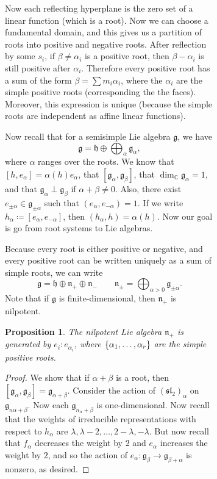 \documentclass[leqno, openany]{memoir}
\newtheorem{prop}[thm]{Proposition}
\theoremstyle{definition}
\theoremstyle{remark}
\theoremstyle{plain}
\theoremstyle{definition}
\theoremstyle{remark}
\newcommand{\C}{\mathbb{C}}
\newcommand{\mf}[1]{\mathfrak{#1}}
\begin{document}
\begin{figure}[H]
\begin{figure}[H]
Now each reflecting hyperplane is the zero set of a linear function (which is a
root). Now we can choose a fundamental domain, and this gives us a partition of
roots into positive and negative roots. After reflection by some $s_i$, if
$\beta \neq \alpha_i$ is a positive root, then $\beta - \alpha_i$ is still
positive after $\alpha_i$. Therefore every positive root has a sum of the form
$\beta = \sum m_i \alpha_i$, where the $\alpha_i$ are the simple positive roots
(corresponding the the faces). Moreover, this expression is unique (because the
simple roots are independent as affine linear functions).

Now recall that for a semisimple Lie algebra $\mf{g}$, we have \[ \mf{g} =
\mf{h} \oplus \bigoplus_{\alpha} \mf{g}_{\alpha}, \] where $\alpha$ ranges over
the roots. We know that $[h,e_{\alpha}] = \alpha(h) e_{\alpha}$, that
$[\mf{g}_{\alpha}, \mf{g}_{\beta}]$, that $\dim_{\C} \mf{g}_{\alpha} = 1$, and
that $\mf{g}_{\alpha} \perp \mf{g}_{\beta}$ if $\alpha + \beta \neq 0$. Also,
there exist $e_{\pm \alpha} \in \mf{g}_{\pm \alpha}$ such that $(e_{\alpha},
e_{-\alpha}) = 1$. If we write $h_{\alpha} \coloneqq [e_{\alpha},
e_{-\alpha}]$, then $(h_{\alpha}, h) = \alpha(h)$. Now our goal is go from root
systems to Lie algebras.

Because every root is either positive or negative, and every positive root can
be written uniquely as a sum of simple roots, we can write \[ \mf{g} = \mf{h}
\oplus \mf{n}_+ \oplus \mf{n}_- \qquad \mf{n}_{\pm} = \bigoplus_{\alpha > 0}
\mf{g}_{\pm \alpha}. \] Note that if $\mf{g}$ is finite-dimensional, then
$\mf{n}_+$ is nilpotent.

\begin{prop} The nilpotent Lie algebra $\mf{n}_+$ is generated by $e_i \colon
e_{\alpha_i}$, where $\qty{\alpha_1, \ldots, \alpha_r}$ are the simple positive
roots.  \end{prop}

\begin{proof} We show that if $\alpha + \beta$ is a root, then
    $[\mf{g}_{\alpha}, \mf{g}_{\beta}] = \mf{g}_{\alpha + \beta}$. Consider the
    action of ${(\mf{sl}_2)}_{\alpha}$ on $\mf{g}_{n \alpha + \beta}$. Now each
    $\mf{g}_{n_{\alpha} + \beta}$ is one-dimensional. Now recall that the
    weights of irreducible representations with respect to $h_{\alpha}$ are
    $\lambda, \lambda - 2, \ldots, 2-\lambda, -\lambda$. But now recall that
    $f_{\alpha}$ decreases the weight by $2$ and $e_{\alpha}$ increases the
    weight by $2$, and so the action of $e_{\alpha} \colon \mf{g}_{\beta} \to
    \mf{g}_{\beta + \alpha}$ is nonzero, as desired.  \end{proof}


\end{figure}
\end{figure}
\end{document}
